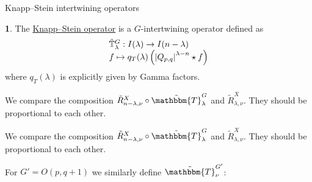 \documentclass[notes,notheorems]{beamer}
\theoremstyle{definition}
\newtheorem{definition}{\translate{Definition}}
\theoremstyle{example}
\theoremstyle{plain}
\theoremstyle{mystyle}
\begin{document}
\begin{frame}{Knapp--Stein intertwining operators}
	\begin{definition}
		The \underline{Knapp--Stein operator} is a $G$-intertwining operator defined as\begin{equation*}
			\begin{array}[]{l}
				\tilde{\mathbb{T}}_\lambda^G:I(\lambda)\to I(n-\lambda)\\
				f\mapsto q_T(\lambda)\left(\myabs{Q_{p,q}}^{\lambda-n}\star f  \right)
			\end{array}
		\end{equation*}
		where $q_T (\lambda)$ is explicitly given by Gamma factors. 
	\end{definition}
		We compare the
		composition $\tilde{R}_{n - \lambda, \nu}^X \circ\tilde{\mathbbm{T}}_{\lambda}^G$ and $\tilde{R}_{\lambda, \nu}^X$. They should
		be proportional to each other.
\end{frame}
\begin{frame}{}
		We compare the
		composition $\tilde{R}_{n - \lambda, \nu}^X \circ\tilde{\mathbbm{T}}_{\lambda}^G$ and $\tilde{R}_{\lambda, \nu}^X$. They should
		be proportional to each other.
		\centerline{}
		For $G' = O (p, q + 1)$ we similarly define $\tilde{\mathbbm{T}}_{\nu}^{G'}$:
		\centerline{
			}
\end{frame}
\end{document}

